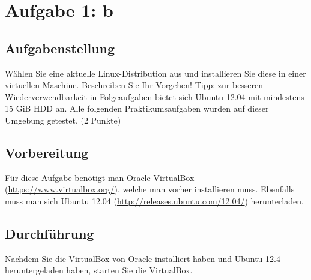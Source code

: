 \newpage
\section{Aufgabe 1: b}

\subsection{Aufgabenstellung}
Wählen Sie eine aktuelle Linux-Distribution aus und installieren Sie diese in einer virtuellen Maschine. Beschreiben Sie Ihr Vorgehen! Tipp: zur besseren Wiederverwendbarkeit in Folgeaufgaben bietet sich Ubuntu 12.04 mit mindestens 15 GiB HDD an. Alle folgenden Praktikumsaufgaben wurden auf dieser Umgebung getestet. (2 Punkte)

\subsection{Vorbereitung}
Für diese Aufgabe benötigt man Oracle VirtualBox (\url{https://www.virtualbox.org/}), welche man vorher installieren muss. Ebenfalls muss man sich Ubuntu 12.04 (\url{http://releases.ubuntu.com/12.04/}) herunterladen.

\subsection{Durchführung}
Nachdem Sie die VirtualBox von Oracle installiert haben und Ubuntu 12.4 heruntergeladen haben, starten Sie die VirtualBox. 

